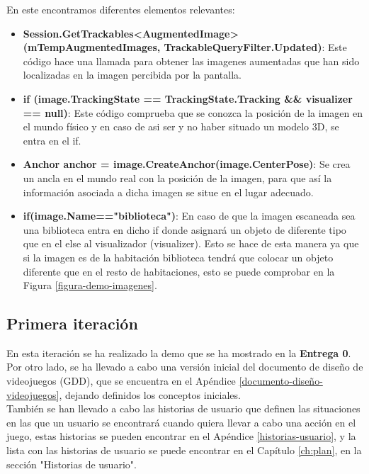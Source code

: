 En este encontramos diferentes elementos relevantes:

\begin{itemize}
  \item \textbf{Session.GetTrackables<AugmentedImage>(mTempAugmentedImages, TrackableQueryFilter.Updated)}: Este código hace una llamada para obtener las imagenes aumentadas que han sido localizadas en la imagen percibida por la pantalla.

  \item \textbf{if (image.TrackingState == TrackingState.Tracking && visualizer == null)}: Este código comprueba que se conozca la posición de la imagen en el mundo físico y en caso de asi ser y no haber situado un modelo 3D, se entra en el if.

  \item \textbf{Anchor anchor = image.CreateAnchor(image.CenterPose)}: Se crea un ancla en el mundo real con la posición de la imagen, para que así la información asociada a dicha imagen se situe en el lugar adecuado.

  \item \textbf{if(image.Name=="biblioteca")}: En caso de que la imagen escaneada sea una biblioteca entra en dicho if donde asignará un objeto de diferente tipo que en el else al visualizador (visualizer). Esto se hace de esta manera ya que si la imagen es de la habitación biblioteca tendrá que colocar un objeto diferente que en el resto de habitaciones, esto se puede comprobar en la Figura \ref{figura-demo-imagenes}.

\end{itemize}

\subsection{Primera iteración}
En esta iteración se ha realizado la demo que se ha mostrado en la \textbf{Entrega 0}.\\

Por otro lado, se ha llevado a cabo una versión inicial del documento de diseño de videojuegos (GDD), que se encuentra en el Apéndice \ref{documento-diseño-videojuegos}, dejando definidos los conceptos iniciales.\\

También se han llevado a cabo las historias de usuario que definen las situaciones en las que un usuario se encontrará cuando quiera llevar a cabo una acción en el juego, estas historias se pueden encontrar en el Apéndice \ref{historias-usuario}, y la lista con las historias de usuario se puede encontrar en el Capítulo \ref{ch:plan}, en la sección "Historias de usuario".\\

